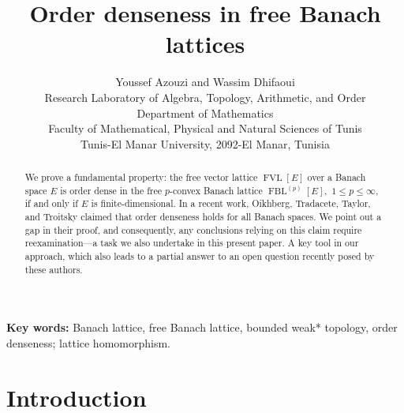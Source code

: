 \documentclass[12pt]{article}%
\begin{document}
\title{Order denseness in free Banach lattices}
\author{Youssef Azouzi and Wassim Dhifaoui\\{\small Research Laboratory of Algebra, Topology, Arithmetic, and Order}\\{\small Department of Mathematics}\\{\small Faculty of Mathematical, Physical and Natural Sciences of Tunis}\\{\small Tunis-El Manar University, 2092-El Manar, Tunisia}}
\date{}
\maketitle

\begin{abstract}
We prove a fundamental property: the free vector lattice $\operatorname*{FVL}%
\left[  E\right]  $ over a Banach space $E$ is order dense in the free
$p$-convex Banach lattice $\operatorname*{FBL}\nolimits^{(p)}\left[  E\right]
,$ $1\leq p\leq\infty,$ if and only if $E$ is finite-dimensional. In a recent
work, Oikhberg, Tradacete, Taylor, and Troitsky \cite[Theorem 2.8]{L-925}
claimed that order denseness holds for all Banach spaces. We point out a gap
in their proof, and consequently, any conclusions relying on this claim
require reexamination---a task we also undertake in this present paper. A key
tool in our approach, which also leads to a partial answer to an open question
recently posed by these authors.

 

\end{abstract}

\textbf{Key words: }Banach lattice, free Banach lattice, bounded weak*
topology, order denseness; lattice homomorphism.

\section{Introduction}
\end{document}
